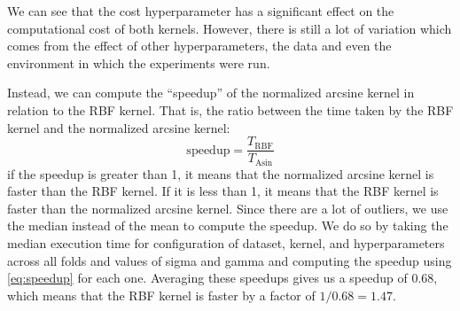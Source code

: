 We can see that the cost hyperparameter has a significant effect on the
computational cost of both kernels. However, there is still a lot of variation
which comes from the effect of other hyperparameters, the data and even the
environment in which the experiments were run.

Instead, we can compute the ``speedup'' of the normalized arcsine kernel
in relation to the RBF kernel. That is, the ratio between the time taken
by the RBF kernel and the normalized arcsine kernel:
\begin{equation}
    \text{speedup} = \frac{T_{\text{RBF}}}{T_{\text{Asin}}} \label{eq:speedup}
\end{equation}
if the speedup is greater than 1, it means that the normalized arcsine kernel
is faster than the RBF kernel. If it is less than 1, it means that the RBF
kernel is faster than the normalized arcsine kernel. Since there are a lot
of outliers, we use the median instead of the mean to compute the speedup. We
do so by taking the median execution time for configuration of dataset, kernel,
and hyperparameters across all folds and values of sigma and gamma and computing
the speedup using \cref{eq:speedup} for each one. Averaging these speedups
gives us a speedup of $0.68$, which means that the RBF kernel is faster by
a factor of $1/0.68 = 1.47$.
